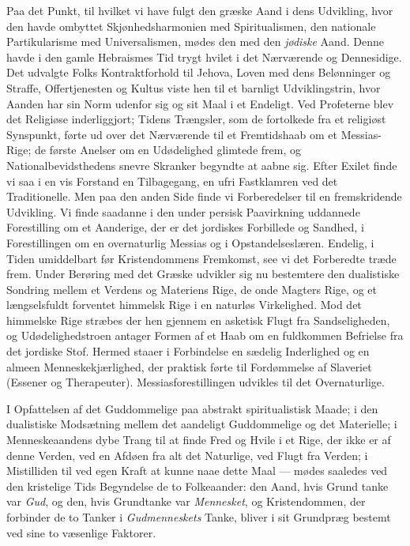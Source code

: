 \documentclass[12pt,a4paper,openany]{book}
\newcommand{\opage}[1]{\marginnote{\footnotesize\textit{[#1]}}}
\begin{document}
Paa det Punkt, til hvilket vi have fulgt den græske
Aand i dens Udvikling, hvor den havde ombyttet Skjønhedsharmonien
med Spiritualismen, den nationale Partikularisme
med Universalismen, mødes den med den \emph{jødiske} Aand.
Denne havde i den gamle Hebraismes Tid trygt hvilet i det
\opage{446}Nærværende og Dennesidige. Det udvalgte Folks Kontraktforhold
til Jehova, Loven med dens Belønninger og Straffe,
Offertjenesten og Kultus viste hen til et barnligt Udviklingstrin,
hvor Aanden har sin Norm udenfor sig og sit Maal
i et Endeligt. Ved Profeterne blev det Religiøse inderliggjort;
Tidens Trængsler, som de fortolkede fra et religiøst
Synspunkt, førte ud over det Nærværende til et Fremtidshaab
om et Messias-Rige; de første Anelser om en Udødelighed
glimtede frem, og Nationalbevidsthedens snevre Skranker
begyndte at aabne sig. Efter Exilet finde vi saa i en vis
Forstand en Tilbagegang, en ufri Fastklamren ved det Traditionelle.
Men paa den anden Side finde vi Forberedelser
til en fremskridende Udvikling. Vi finde saadanne i den
under persisk Paavirkning uddannede Forestilling om et
Aanderige, der er det jordiskes Forbillede og Sandhed, i Forestillingen
om en overnaturlig Messias og i Opstandelseslæren.
Endelig, i Tiden umiddelbart før Kristendommens Fremkomst,
see vi det Forberedte træde frem. Under Berøring med det
Græske udvikler sig nu bestemtere den dualistiske Sondring
mellem et Verdens og Materiens Rige, de onde Magters
Rige, og et længselsfuldt forventet himmelsk Rige i en naturløs
Virkelighed. Mod det himmelske Rige stræbes der hen
gjennem en asketisk Flugt fra Sandseligheden, og Udødelighedstroen
antager Formen af et Haab om en fuldkommen
Befrielse fra det jordiske Stof. Hermed staaer i Forbindelse
en sædelig Inderlighed og en almeen Menneskekjærlighed, der
praktisk førte til Fordømmelse af Slaveriet (Essener og Therapeuter).
Messiasforestillingen udvikles til det Overnaturlige.

I Opfattelsen af det Guddommelige paa abstrakt spiritualistisk
Maade; i den dualistiske Modsætning mellem det
aandeligt Guddommelige og det Materielle; i Menneskeaandens
dybe Trang til at finde Fred og Hvile i et Rige, der ikke
er af denne Verden, ved en Afdøen fra alt det Naturlige,
ved Flugt fra Verden; i Mistilliden til ved egen Kraft at
kunne naae dette Maal --- mødes saaledes ved den kristelige
Tids Begyndelse de to Folkeaander: den Aand, hvis Grund%
\opage{447}tanke var \emph{Gud}, og den, hvis Grundtanke var \emph{Mennesket},
og Kristendommen, der forbinder de to Tanker i \emph{Gudmenneskets}
Tanke, bliver i sit Grundpræg bestemt ved sine
to væsenlige Faktorer.
\end{document}
